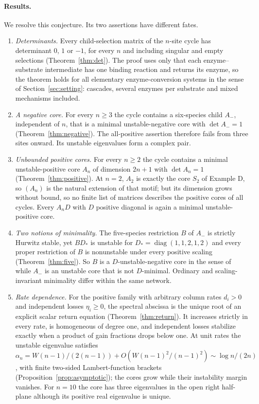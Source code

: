 \documentclass[11pt,a4paper]{article}
\theoremstyle{plain}
\theoremstyle{definition}
\theoremstyle{remark}
\newcommand{\Aminus}{A_{-}}
\DeclareMathOperator{\diag}{diag}
\begin{document}
\paragraph{Results.}
We resolve this conjecture. Its two assertions have different fates.

\begin{enumerate}[label=(\alph*)]
\item \emph{Determinants.} Every child-selection matrix of the $n$-site cycle has determinant $0$, $1$ or $-1$, for every $n$ and including singular and empty selections (Theorem~\ref{thm:det}). The proof uses only that each enzyme--substrate intermediate has one binding reaction and returns its enzyme, so the theorem holds for all elementary enzyme-conversion systems in the sense of Section~\ref{sec:setting}: cascades, several enzymes per substrate and mixed mechanisms included.
\item \emph{A negative core.} For every $n\ge3$ the cycle contains a six-species child $\Aminus$, independent of $n$, that is a minimal unstable-negative core with $\det\Aminus=1$ (Theorem~\ref{thm:negative}). The all-positive assertion therefore fails from three sites onward. Its unstable eigenvalues form a complex pair.
\item \emph{Unbounded positive cores.} For every $n\ge2$ the cycle contains a minimal unstable-positive core $A_n$ of dimension $2n+1$ with $\det A_n=1$ (Theorem~\ref{thm:positive}). At $n=2$, $A_2$ is exactly the core $S_2$ of Example D, so $(A_n)$ is the natural extension of that motif; but its dimension grows without bound, so no finite list of matrices describes the positive cores of all cycles. Every $A_nD$ with $D$ positive diagonal is again a minimal unstable-positive core.
\item \emph{Two notions of minimality.} The five-species restriction $B$ of $\Aminus$ is strictly Hurwitz stable, yet $BD_*$ is unstable for $D_*=\diag(1,1,2,1,2)$ and every proper restriction of $B$ is nonunstable under every positive scaling (Theorem~\ref{thm:five}). So $B$ is a $D$-unstable-negative core in the sense of \citep{VassenaStadler2024} while $\Aminus$ is an unstable core that is not $D$-minimal. Ordinary and scaling-invariant minimality differ within the same network.
\item \emph{Rate dependence.} For the positive family with arbitrary column rates $d_i>0$ and independent losses $\eta_i\ge0$, the spectral abscissa is the unique root of an explicit scalar return equation (Theorem~\ref{thm:return}). It increases strictly in every rate, is homogeneous of degree one, and independent losses stabilize exactly when a product of gain fractions drops below one. At unit rates the unstable eigenvalue satisfies $\alpha_n=W(n-1)/(2(n-1))+O(W(n-1)^2/(n-1)^2)\sim\log n/(2n)$, with finite two-sided Lambert-function brackets (Proposition~\ref{prop:asymptotic}); the cores grow while their instability margin vanishes. For $n=10$ the core has three eigenvalues in the open right half-plane although its positive real eigenvalue is unique.

\end{enumerate}
\end{document}

